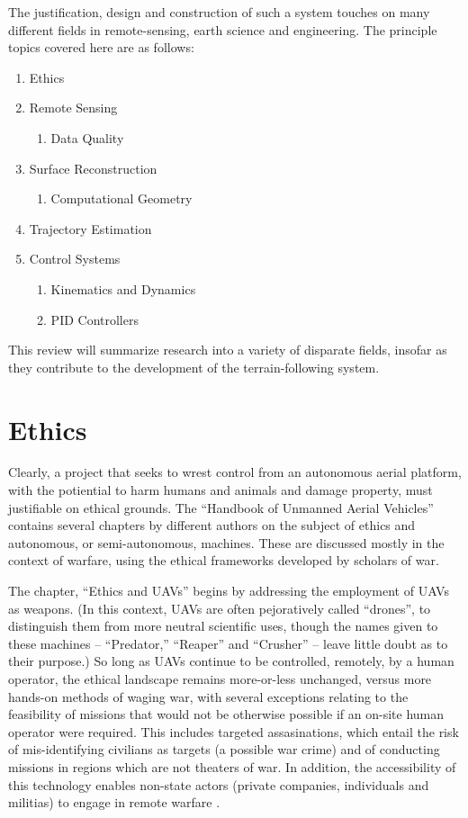 \documentclass[10pt]{article}
\begin{document}
The justification, design and construction of such a system touches on many different fields in remote-sensing, earth science and engineering. The principle topics covered here are as follows:

\begin{enumerate}
\item Ethics
\item Remote Sensing
\begin{enumerate}
\item Data Quality
\end{enumerate}
\item Surface Reconstruction
	\begin{enumerate}
	\item Computational Geometry
	\end{enumerate}
\item Trajectory Estimation
\item Control Systems
	\begin{enumerate}
	\item Kinematics and Dynamics
	\item PID Controllers
	\end{enumerate}
\end{enumerate}


This review will summarize research into a variety of disparate fields, insofar as they contribute to the development of the terrain-following system.


\section{Ethics}

Clearly, a project that seeks to wrest control from an autonomous aerial platform, with the potiential to harm humans and animals and damage property, must justifiable on ethical grounds. The ``Handbook of Unmanned Aerial Vehicles'' \cite{Valavanis2015j} contains several chapters by different authors on the subject of ethics and autonomous, or semi-autonomous, machines. These are discussed mostly in the context of warfare, using the ethical frameworks developed by scholars of war.

The chapter, ``Ethics and UAVs'' \cite{Valavanis2015bz} begins by addressing the employment of UAVs as weapons. (In this context, UAVs are often pejoratively called ``drones'', to distinguish them from more neutral scientific uses, though the names given to these machines -- ``Predator,'' ``Reaper'' and ``Crusher'' \cite{Lucas2011} -- leave little doubt as to their purpose.) So long as UAVs continue to be controlled, remotely, by a human operator, the ethical landscape remains more-or-less unchanged, versus more hands-on methods of waging war, with several exceptions relating to the feasibility of missions that would not be otherwise possible if an on-site human operator were required. This includes targeted assasinations, which entail the risk of mis-identifying civilians as targets (a possible war crime) and of conducting missions in regions which are not theaters of war. In addition, the accessibility of this technology enables non-state actors (private companies, individuals and militias) to engage in remote warfare \cite[p.2867]{Valavanis2015bz}. 
\end{document}
